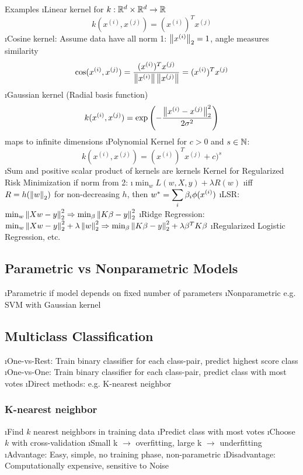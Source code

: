 Examples
\bi
\i Linear kernel for $k: \mathbb{R}^d \times \mathbb{R}^d \to \mathbb{R}$ \[k(x^{(i)}, x^{(j)}) = (x^{(i)})^T x^{(j)}\]
\i Cosine kernel: Assume data have all norm 1: $\left\lVert x^{(i)}\right\rVert_2 = 1$, angle measures similarity
\[
\cos(x^{(i)}, x^{(j)}) = \frac{(x^{(i)})^T x^{(j)}}{\left\lVert x^{(i)}\right\rVert \left\lVert x^{(j)}\right\rVert} = (x^{(i)})^T x^{(j)}
\]
\i Gaussian kernel (Radial basis function) \[
k(x^{(i)}, x^{(j)}) = \exp\left(-\frac{\left\lVert x^{(i)} - x^{(j)}\right\rVert_2^2}{2\sigma^2}\right)
\]
maps to infinite dimensions
\i Polynomial Kernel for $c > 0$ and $s \in \mathbb{N}$:
\[
k(x^{(i)}, x^{(j)}) = (x^{(i)})^T x^{(j)} + c)^s
\]
\i Sum and positive scalar product of kernels are kernels
\ei
\newpage
Kernel for Regularized Risk Minimization if norm from 2:
\bi
\i $\min_w L(w,X,y) + \lambda R(w)$
\i iff $R = h(\left\lVert w\right\rVert_2)$ for non-decreasing $h$, then $w^* = \displaystyle\sum_i \beta_i \phi(x^{(i)})$
\i LSR: $\min_w \left\lVert Xw-y\right\rVert^2_2 \Rightarrow \min_\beta \left\lVert K\beta - y\right\rVert^2_2$ 
\i Ridge Regression: $\min_w \left\lVert Xw-y\right\rVert^2_2 + \lambda \left\lVert w\right\rVert_2^2 \Rightarrow \min_\beta \left\lVert K\beta - y\right\rVert^2_2 + \lambda \beta^T K \beta$
\i Regularized Logistic Regression, etc.
\ei

\subsection{Parametric vs Nonparametric Models}

\bi
\i Parametric if model depends on fixed number of parameters
\i Nonparametric e.g. SVM with Gaussian kernel
\ei

\subsection{Multiclass Classification}

\bi
\i One-vs-Rest: Train binary classifier for each class-pair, predict highest score class
\i One-vs-One: Train binary classifier for each class-pair, predict class with most votes
\i Direct methods: e.g. K-nearest neighbor 
\ei 

\subsubsection{K-nearest neighbor}

\bi
\i Find $k$ nearest neighbors in training data
\i Predict class with most votes
\i Choose $k$ with cross-validation
\i Small k $\to$ overfitting, large k $\to$ underfitting
\i Advantage: Easy, simple, no training phase, non-parametric
\i Disadvantage: Computationally expensive, sensitive to Noise
\ei

